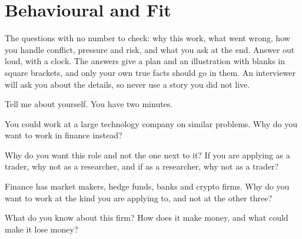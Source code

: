 \chapter{Behavioural and Fit}\label{ch:iv2:behavioural-and-fit}

\begin{ivtrains}
The questions with no number to check: why this work, what went wrong, how you handle conflict, pressure and risk, and what you ask at the end. Answer out loud, with a clock. The answers give a plan and an illustration with blanks in square brackets, and only your own true facts should go in them. An interviewer will ask you about the details, so never use a story you did not live.
\end{ivtrains}

\begin{question}\label{iq:iv2:behavioural-and-fit:1}
Tell me about yourself. You have two minutes.
\end{question}

\begin{question}\label{iq:iv2:behavioural-and-fit:2}
You could work at a large technology company on similar problems. Why do you want to work in finance instead?
\end{question}

\begin{question}\label{iq:iv2:behavioural-and-fit:3}
Why do you want this role and not the one next to it? If you are applying as a trader, why not as a researcher, and if as a researcher, why not as a trader?
\end{question}

\begin{question}\label{iq:iv2:behavioural-and-fit:4}
Finance has market makers, hedge funds, banks and crypto firms. Why do you want to work at the kind you are applying to, and not at the other three?
\end{question}

\begin{question}\label{iq:iv2:behavioural-and-fit:5}
What do you know about this firm? How does it make money, and what could make it lose money?
\end{question}

